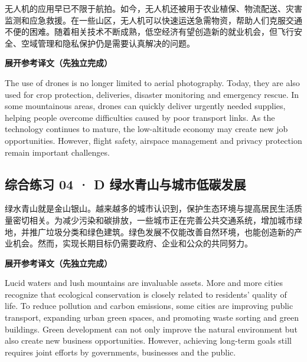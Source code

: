 \documentclass[a4paper,11pt,UTF8,fontset=none]{ctexart}
\begin{document}
\par

\noindent 无人机的应用早已不限于航拍。如今，无人机还被用于农业植保、物流配送、灾害监测和应急救援。在一些山区，无人机可以快速运送急需物资，帮助人们克服交通不便的困难。随着相关技术不断成熟，低空经济有望创造新的就业机会，但飞行安全、空域管理和隐私保护仍是需要认真解决的问题。\par

\noindent\colorbox{HeadBlue}{\strut {\bfseries 展开参考译文（先独立完成）}}\par\vspace{1pt}

\noindent The use of drones is no longer limited to aerial photography. Today, they are also used for crop protection, deliveries, disaster monitoring and emergency rescue. In some mountainous areas, drones can quickly deliver urgently needed supplies, helping people overcome difficulties caused by poor transport links. As the technology continues to mature, the low-altitude economy may create new job opportunities. However, flight safety, airspace management and privacy protection remain important challenges.\par

\vspace{4pt}

\subsection{综合练习 04 · D 绿水青山与城市低碳发展}

\par

\noindent 绿水青山就是金山银山。越来越多的城市认识到，保护生态环境与提高居民生活质量密切相关。为减少污染和碳排放，一些城市正在完善公共交通系统，增加城市绿地，并推广垃圾分类和绿色建筑。绿色发展不仅能改善自然环境，也能创造新的产业机会。然而，实现长期目标仍需要政府、企业和公众的共同努力。\par

\noindent\colorbox{HeadBlue}{\strut {\bfseries 展开参考译文（先独立完成）}}\par\vspace{1pt}

\noindent Lucid waters and lush mountains are invaluable assets. More and more cities recognize that ecological conservation is closely related to residents’ quality of life. To reduce pollution and carbon emissions, some cities are improving public transport, expanding urban green spaces, and promoting waste sorting and green buildings. Green development can not only improve the natural environment but also create new business opportunities. However, achieving long-term goals still requires joint efforts by governments, businesses and the public.\par
\end{document}
